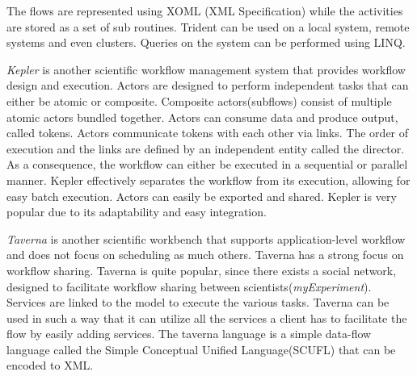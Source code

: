 \documentclass[11pt,twocolumn]{article}
\begin{document}
    The flows are represented using XOML (XML Specification) while
    the activities are stored as a set of sub routines. Trident
    can be used on a local system, remote systems and even clusters.
    Queries on the system can be performed using LINQ.
    \cite{Simmhan2011790}

    \emph{Kepler} is another scientific workflow
    management system that provides workflow design and execution.
    Actors are designed to perform independent tasks that can either
    be atomic or  composite. Composite actors(subflows) consist
    of multiple   atomic actors bundled together. Actors can consume data and
    produce output, called tokens. Actors communicate tokens with
    each other via links. The order of execution and the links are
    defined by an independent entity called the director. As a
    consequence, the workflow can either be executed in a
    sequential or parallel manner. Kepler effectively separates
    the workflow from its execution, allowing for easy batch
    execution. Actors can easily be exported and shared.
    Kepler is very popular due to its adaptability and easy
    integration. \cite{Wang:2009:KHG:1645164.1645176}

    \emph{Taverna} is another scientific workbench that supports
    application-level workflow and does not focus on scheduling
    as much others. Taverna has a strong focus on workflow
    sharing. Taverna is quite popular, since there exists
    a social network, designed to facilitate workflow sharing
    between scientists(\emph{myExperiment}). Services are linked to the model to
    execute the various tasks. Taverna can be used in such
    a way that it can utilize all the services a client has
    to facilitate the flow by easily adding services. The
    taverna language is a simple data-flow language called
    the Simple Conceptual Unified Language(SCUFL) that can
    be encoded to XML\cite{4721191}.
\end{document}
